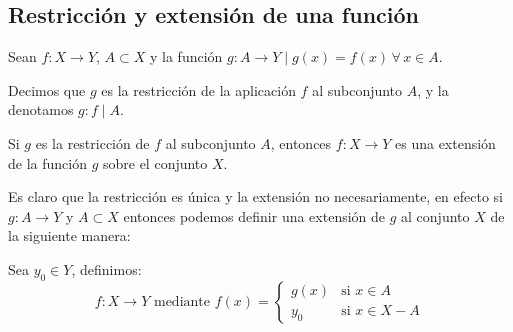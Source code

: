 \subsection{Restricción y extensión de una función} \label{sec:restr}
\vspace{3mm}
\begin{fmd-definition}
	Sean $f:X \rightarrow Y$, $A \subset X$ y la función $g: A \rightarrow Y \mid 
	g(x) = f(x) \, \forall \, x \in A$.
	
	Decimos que $g$ es la restricción de la aplicación $f$ al subconjunto $A$, y
	la denotamos $g:f \mid A$.
\end{fmd-definition}

\begin{fmd-definition}
	Si $g$ es la restricción de $f$ al subconjunto $A$, entonces $f: X \rightarrow
	Y$ es una extensión de la función $g$ sobre el conjunto $X$.
\end{fmd-definition}
Es claro que la restricción es única y la extensión no necesariamente, en efecto 
si $g: A \rightarrow Y$ y $A \subset X$ entonces podemos definir una extensión de
$g$ al conjunto $X$ de la siguiente manera:

Sea $y_0 \in Y$, definimos: 
\[ f: X \rightarrow Y \mbox{ mediante } f(x) = \begin{cases}
	g(x) & \mbox{si } x \in A\\
	y_0 & \mbox{si } x \in X - A
\end{cases} \]